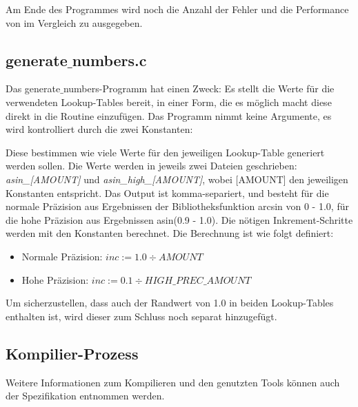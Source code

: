 \documentclass{article}
\begin{document}
\vspace{0.5cm}



\vspace{0.5cm}

	Am Ende des Programmes wird noch die Anzahl der Fehler und die Performance
	von  im Vergleich zu  ausgegeben.

\subsection{generate$\_$numbers.c}

	Das generate$\_$numbers-Programm hat einen Zweck:
	Es stellt die Werte für die verwendeten Lookup-Tables
	bereit, in einer Form, die es möglich macht
	diese direkt in die Routine einzufügen.
	Das Programm nimmt keine Argumente,
	es wird kontrolliert durch die zwei Konstanten:
	
	Diese bestimmen wie viele Werte für den jeweiligen Lookup-Table
	generiert werden sollen.
	Die Werte werden in jeweils zwei Dateien geschrieben:
	\emph{asin\_[AMOUNT]} und \emph{asin\_high\_[AMOUNT]},
	wobei [AMOUNT] den jeweiligen Konstanten entspricht.
	Das Output ist komma-separiert, und besteht für die normale
	Präzision aus Ergebnissen der Bibliotheksfunktion arcsin von 0 - 1.0,
	für die hohe Präzision aus Ergebnissen asin(0.9 - 1.0).
	Die nötigen Inkrement-Schritte werden mit den Konstanten berechnet.
	Die Berechnung ist wie folgt definiert:
	\begin{itemize}
		\item Normale Präzision: $inc := 1.0 \div AMOUNT$
		\item Hohe Präzision: $inc := 0.1 \div HIGH\_PREC\_AMOUNT$
	\end{itemize}
	Um sicherzustellen, dass auch der Randwert von
	1.0 in beiden Lookup-Tables enthalten ist,
	wird dieser zum Schluss noch separat hinzugefügt.
	
	\subsection{Kompilier-Prozess}
		Weitere Informationen zum Kompilieren und den genutzten Tools können auch der Spezifikation entnommen werden.
\end{document}
